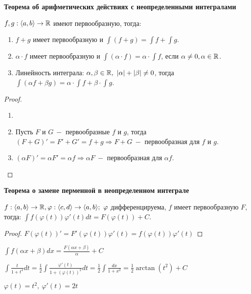 \begin{theorem}
    \textbf{Теорема об арифметических действиях с неопределенными интегралами}

    $f,g:\langle a,b \rangle \rightarrow \mathbb{R}$ имеют первообразную, тогда:
    \begin{enumerate}
        \item $f+g$ имеет первообразную и $\int (f+g)=\int f + \int g$.
        \item $\alpha\cdot f$ имеет первообразную и $\int (\alpha\cdot f)=\alpha\cdot\int f$, если $\alpha\neq 0 ,\alpha\in \mathbb{R}$.
        \item Линейность интеграла: $\alpha,\beta\in \mathbb{R},\ |\alpha|+|\beta|\neq 0$, тогда $\int(\alpha f+\beta g)=\alpha\cdot\int f+\beta\cdot\int g$.
    \end{enumerate}
\end{theorem}

\begin{proof}
    \begin{enumerate}
        \item[]
        \item Пусть $F$ и $G\ -$ первообразные $f$ и $g$, тогда $(F+G)'=F'+G'=f+g\Rightarrow F+G\ -$ первообразная для $f$ и $g$.
        \item $(\alpha F)'=\alpha F'=\alpha f \Rightarrow \alpha F \ -$ первообразная для $\alpha f$.
    \end{enumerate}
\end{proof}

\begin{theorem}
    \textbf{Теорема о замене перменной в неопределенном интеграле}

    $f:\langle a,b \rangle \rightarrow \R,\varphi:\langle c,d \rangle \rightarrow \langle a,b \rangle;\ \varphi$ дифференцируема, $f$ имеет первообразную $F$, тогда: $\int f(\varphi(t))\varphi'(t)dt=F(\varphi(t))+C$.
\end{theorem}

\begin{proof}
    $F(\varphi(t))'=F'(\varphi(t))\varphi'(t)=f(\varphi(t))\varphi'(t)$
\end{proof}

\begin{corollary}
    $\int f(\alpha x+\beta)dx = \frac{F(\alpha x+\beta)}{\alpha}+C$
\end{corollary}

\begin{example}
    $\int \frac{t}{1+t^4}dt=\frac{1}{2}\int \frac{\varphi'(t)}{1+(\varphi(t))^2}dt=\frac{1}{2}\int \frac{dx}{1+x^2}=\frac{1}{2}\arctan (t^2)+C$

    $\varphi(t)=t^2,\ \varphi'(t)=2t$
\end{example}

